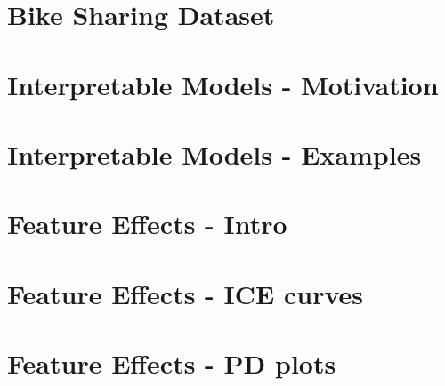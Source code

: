\documentclass[11pt,compress,t,notes=noshow, aspectratio=169, xcolor=table]{beamer}
\newcommand{\pathiml}{../}
\begin{document}


\section{Bike Sharing Dataset}


\section{Interpretable Models - Motivation}


\section{Interpretable Models - Examples}


\section{Feature Effects - Intro}


\section{Feature Effects - ICE curves}


\section{Feature Effects - PD plots}


\end{document}
